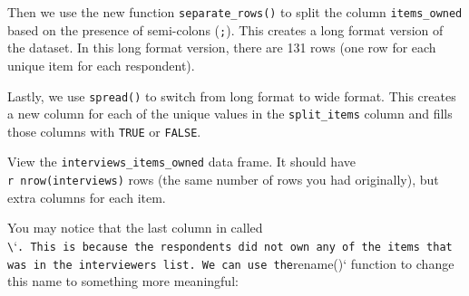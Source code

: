 \documentclass[]{book}
\newenvironment{Shaded}{\begin{snugshade}}{\end{snugshade}}
\newcommand{\KeywordTok}[1]{\textcolor[rgb]{0.13,0.29,0.53}{\textbf{#1}}}
\newcommand{\DataTypeTok}[1]{\textcolor[rgb]{0.13,0.29,0.53}{#1}}
\newcommand{\StringTok}[1]{\textcolor[rgb]{0.31,0.60,0.02}{#1}}
\newcommand{\OtherTok}[1]{\textcolor[rgb]{0.56,0.35,0.01}{#1}}
\newcommand{\OperatorTok}[1]{\textcolor[rgb]{0.81,0.36,0.00}{\textbf{#1}}}
\newcommand{\NormalTok}[1]{#1}
\begin{document}
\begin{Shaded}
\end{Shaded}

Then we use the new function \texttt{separate\_rows()} to split the
column \texttt{items\_owned} based on the presence of semi-colons
(\texttt{;}). This creates a long format version of the dataset. In this
long format version, there are 131 rows (one row for each unique item
for each respondent).

\begin{Shaded}
\end{Shaded}

Lastly, we use \texttt{spread()} to switch from long format to wide
format. This creates a new column for each of the unique values in the
\texttt{split\_items} column and fills those columns with \texttt{TRUE}
or \texttt{FALSE}.

\begin{Shaded}
\end{Shaded}

View the \texttt{interviews\_items\_owned} data frame. It should have
\texttt{r\ nrow(interviews)} rows (the same number of rows you had
originally), but extra columns for each item.

You may notice that the last column in called
\texttt{\textbackslash{}}`\texttt{.\ This\ is\ because\ the\ respondents\ did\ not\ own\ any\ of\ the\ items\ that\ was\ in\ the\ interviewer\textquotesingle{}s\ list.\ We\ can\ use\ the}rename()`
function to change this name to something more meaningful:

\begin{Shaded}
\end{Shaded}
\end{document}
